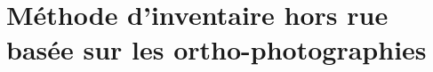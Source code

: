 \section{Méthode d'inventaire hors rue basée sur les ortho-photographies}\label{sec:meth_orthophoto}